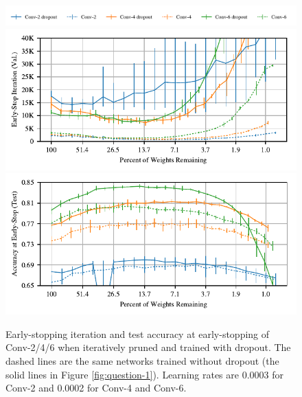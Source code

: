\begin{figure}
\centering
\includegraphics[width=.8\textwidth]{graphs/cifar10/conv/conv_paper_dropoutall_w/legend}%
\vspace{-1em}
\includegraphics[width=.5\textwidth]{graphs/cifar10/conv/conv_paper_dropoutall_w/iteration}%
\includegraphics[width=.5\textwidth]{graphs/cifar10/conv/conv_paper_dropoutall_w/accuracy}%
\vspace{-.5em}
\caption{Early-stopping iteration and test accuracy at early-stopping of Conv-2/4/6 when iteratively pruned and trained with dropout.
The dashed lines are the same networks trained without dropout (the solid lines in Figure \ref{fig:question-1}). Learning rates are 0.0003 for
Conv-2 and 0.0002 for Conv-4 and Conv-6.}
\label{fig:dropout}
\end{figure}
